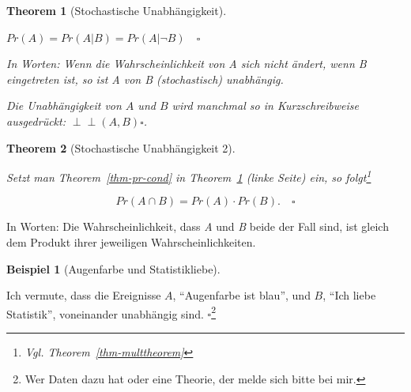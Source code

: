 \documentclass[
  ngerman,
  letterpaper,
  twoside,
  open=any]{scrbook}
\theoremstyle{definition}
\newtheorem{example}{Beispiel}[chapter]
\theoremstyle{plain}
\newtheorem{theorem}{Theorem}[chapter]
\theoremstyle{definition}
\theoremstyle{definition}
\theoremstyle{definition}
\newtheorem{example}{Beispiel}[chapter]
\theoremstyle{definition}
\theoremstyle{remark}
\begin{document}
\providecommand{\indep}{\perp \!\!\! \perp}

\begin{theorem}[Stochastische
Unabhängigkeit]\protect\hypertarget{thm-indep}{}\label{thm-indep}

\(Pr(A) = Pr(A|B) = Pr(A|\neg B) \quad \square\)

In Worten: Wenn die Wahrscheinlichkeit von \emph{A} sich nicht ändert,
wenn \emph{B} eingetreten ist, so ist \emph{A} von \emph{B}
(stochastisch) unabhängig.

Die Unabhängigkeit von \(A\) und \(B\) wird manchmal so in
Kurzschreibweise ausgedrückt: \(\perp \!\!\! \perp(A, B) \square\).

\end{theorem}

\begin{theorem}[Stochastische Unabhängigkeit
2]\protect\hypertarget{thm-indep2}{}\label{thm-indep2}

Setzt man Theorem~\ref{thm-pr-cond} in Theorem~\ref{thm-indep} (linke
Seite) ein, so folgt\footnote{Vgl. Theorem~\ref{thm-multtheorem}}

\[Pr(A \cap B) = Pr(A) \cdot Pr(B).\quad \square\]

\end{theorem}

In Worten: Die Wahrscheinlichkeit, dass \emph{A} und \emph{B} beide der
Fall sind, ist gleich dem Produkt ihrer jeweiligen Wahrscheinlichkeiten.

\begin{example}[Augenfarbe und
Statistikliebe]\protect\hypertarget{exm-indep1}{}\label{exm-indep1}

Ich vermute, dass die Ereignisse \(A\), \enquote{Augenfarbe ist blau},
und \(B\), \enquote{Ich liebe Statistik}, voneinander unabhängig sind.
\(\square\)\footnote{Wer Daten dazu hat oder eine Theorie, der melde
  sich bitte bei mir.}

\end{example}
\end{document}
